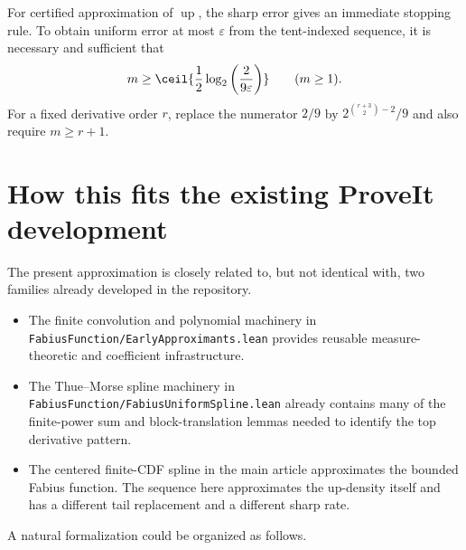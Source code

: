 \documentclass[11pt,oneside]{article}
\theoremstyle{definition}
\theoremstyle{remark}
\newcommand{\Up}{\operatorname{up}}
\begin{document}
For certified approximation of $\Up$, the sharp error gives an immediate stopping rule.  To
obtain uniform error at most $\varepsilon$ from the tent-indexed sequence, it is necessary
and sufficient that
\begin{equation}
 m\ge
 \ceil{\frac12\log_2\left(\frac{2}{9\varepsilon}\right)}
 \qquad(m\ge1).
 \label{repeated2:eq:stopping-rule}
\end{equation}
For a fixed derivative order $r$, replace the numerator $2/9$ by
$2^{\binom{r+3}{2}-2}/9$ and also require $m\ge r+1$.

\section{How this fits the existing ProveIt development}
\label{repeated2:sec:formalization-roadmap}

The present approximation is closely related to, but not identical with, two families
already developed in the repository.

\begin{itemize}
\item The finite convolution and polynomial machinery in
\nolinkurl{FabiusFunction/EarlyApproximants.lean} provides reusable measure-theoretic and
coefficient infrastructure.
\item The Thue--Morse spline machinery in
\nolinkurl{FabiusFunction/FabiusUniformSpline.lean} already contains many of the finite-power
sum and block-translation lemmas needed to identify the top derivative pattern.
\item The centered finite-CDF spline in the main article approximates the bounded Fabius
function.  The sequence here approximates the up-density itself and has a different tail
replacement and a different sharp rate.
\end{itemize}

A natural formalization could be organized as follows.
\end{document}

